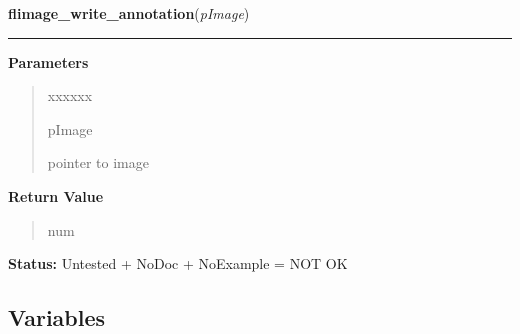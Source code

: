 \hspace{.8\funcindent}\begin{boxedminipage}{\funcwidth}

    \raggedright \textbf{flimage\_write\_annotation}(\textit{pImage})

    \vspace{-1.5ex}

    \rule{\textwidth}{0.5\fboxrule}
\setlength{\parskip}{2ex}
\setlength{\parskip}{1ex}
      \textbf{Parameters}
      \vspace{-1ex}

      \begin{quote}
        \begin{Ventry}{xxxxxx}

          \item[pImage]

          pointer to image

        \end{Ventry}

      \end{quote}

      \textbf{Return Value}
    \vspace{-1ex}

      \begin{quote}
      num

      \end{quote}

\textbf{Status:} Untested + NoDoc + NoExample = NOT OK



    \end{boxedminipage}



  \subsection{Variables}

